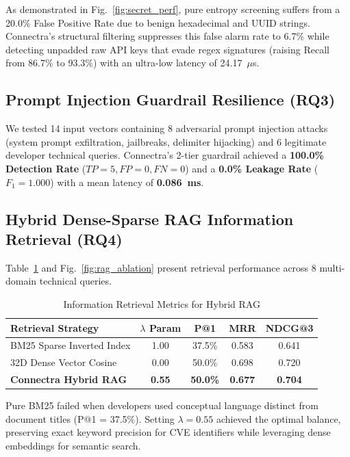 \documentclass[journal,10pt,twocolumn]{IEEEtran}
\begin{document}
As demonstrated in Fig.~\ref{fig:secret_perf}, pure entropy screening suffers from a 20.0\% False Positive Rate due to benign hexadecimal and UUID strings. Connectra's structural filtering suppresses this false alarm rate to 6.7\% while detecting unpadded raw API keys that evade regex signatures (raising Recall from 86.7\% to 93.3\%) with an ultra-low latency of 24.17~$\mu$s.

\subsection{Prompt Injection Guardrail Resilience (RQ3)}
We tested 14 input vectors containing 8 adversarial prompt injection attacks (system prompt exfiltration, jailbreaks, delimiter hijacking) and 6 legitimate developer technical queries. Connectra's 2-tier guardrail achieved a \textbf{100.0\% Detection Rate} ($TP=5, FP=0, FN=0$) and a \textbf{0.0\% Leakage Rate} ($F_1 = 1.000$) with a mean latency of \textbf{0.086~ms}.

\subsection{Hybrid Dense-Sparse RAG Information Retrieval (RQ4)}
Table~\ref{tab:rag_comparison} and Fig.~\ref{fig:rag_ablation} present retrieval performance across 8 multi-domain technical queries.

\begin{table}[htbp]
\centering
\caption{Information Retrieval Metrics for Hybrid RAG}
\label{tab:rag_comparison}
\begin{tabular}{lcccc}
\toprule
\textbf{Retrieval Strategy} & \textbf{$\lambda$ Param} & \textbf{P@1} & \textbf{MRR} & \textbf{NDCG@3} \\
\midrule
BM25 Sparse Inverted Index & 1.00 & 37.5\% & 0.583 & 0.641 \\
32D Dense Vector Cosine & 0.00 & 50.0\% & 0.698 & 0.720 \\
\textbf{Connectra Hybrid RAG} & \textbf{0.55} & \textbf{50.0\%} & \textbf{0.677} & \textbf{0.704} \\
\bottomrule
\end{tabular}
\end{table}

Pure BM25 failed when developers used conceptual language distinct from document titles (P@1 = 37.5\%). Setting $\lambda = 0.55$ achieved the optimal balance, preserving exact keyword precision for CVE identifiers while leveraging dense embeddings for semantic search.
\end{document}
